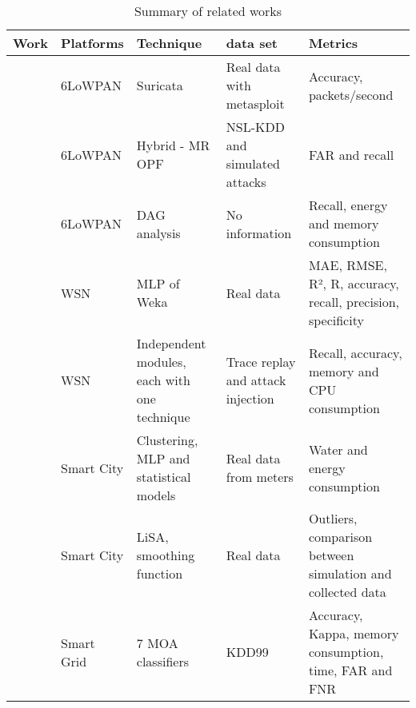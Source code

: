 \begin{table*}[htb]
\caption{Summary of related works}
\centering
\begin{scriptsize}
\begin{tabularx}{\textwidth}{l|l|X|X|X}
Work                                         & Platforms    & Technique & data set & Metrics\\\hline\hline
\cite{dos-6lowpan-iot}                       & 6LoWPAN      & Suricata & Real data with metasploit & Accuracy, packets/second\\\hline
\cite{Hybrid-ids-arch-iot}                   & 6LoWPAN      & Hybrid - MR OPF & NSL-KDD and simulated attacks & FAR and recall\\\hline
\cite{SVELTE}                                & 6LoWPAN      & DAG analysis & No information & Recall, energy and memory consumption\\\hline
\cite{Fault-tolerance-disaster}              & WSN          & MLP of Weka & Real data & MAE, RMSE, R², R, accuracy, recall, precision, specificity\\\hline
\cite{Kalis}                                 & WSN          & Independent modules, each with one technique & Trace replay and attack injection & Recall, accuracy, memory and CPU consumption\\\hline
\cite{IoT-arch-smartmeter}                   & Smart City   & Clustering, MLP and statistical models & Real data from meters & Water and energy consumption\\\hline
\cite{scalable-anomaly-detection-smart-city} & Smart City   & LiSA, smoothing function & Real data & Outliers, comparison between simulation and collected data\\\hline
\cite{DS-based-IDS-SmartGrid}                & Smart Grid   & 7 MOA classifiers & KDD99 & Accuracy, Kappa, memory consumption, time, FAR and FNR \\\hline
\end{tabularx}
\label{tab:summary}
\end{scriptsize}
\end{table*}

